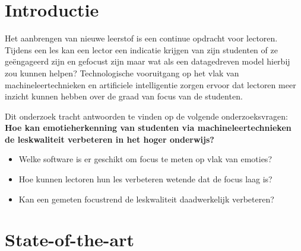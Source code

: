 
\section{Introductie} %
\label{sec:introductie}


Het aanbrengen van nieuwe leerstof is een continue opdracht voor lectoren. Tijdens een les kan een lector een indicatie krijgen van zijn studenten of ze geëngageerd zijn en gefocust zijn maar wat als een datagedreven model hierbij zou kunnen helpen? Technologische vooruitgang op het vlak van machineleertechnieken en artificiele intelligentie zorgen ervoor dat lectoren meer inzicht kunnen hebben over de graad van focus van de studenten.

Dit onderzoek tracht antwoorden te vinden op de volgende onderzoeksvragen: 
\textbf{Hoe kan emotieherkenning van studenten via machineleertechnieken de leskwaliteit verbeteren in het hoger onderwijs?}
\begin{itemize}
    \item Welke software is er geschikt om focus te meten op vlak van emoties?
    \item Hoe kunnen lectoren hun les verbeteren wetende dat de focus laag is?
    \item Kan een gemeten focustrend de leskwaliteit daadwerkelijk verbeteren?
\end{itemize}


\section{State-of-the-art}
\label{sec:state-of-the-art}


